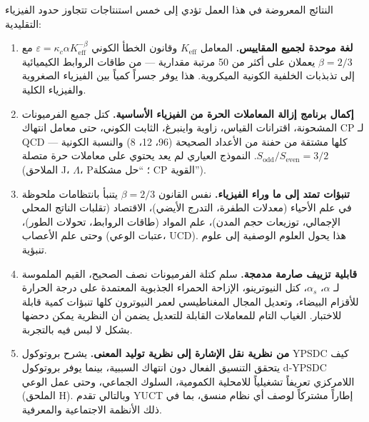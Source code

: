 \documentclass[11pt,a4paper]{article}
\begin{document}
	النتائج المعروضة في هذا العمل تؤدي إلى خمس استنتاجات تتجاوز حدود الفيزياء التقليدية:
	\begin{enumerate}
		\item \textbf{لغة موحدة لجميع المقاييس.} المعامل $K_{\mathrm{eff}}$ وقانون الخطأ الكوني $\varepsilon = \kappa_c \alpha K_{\mathrm{eff}}^{-\beta}$ مع $\beta = 2/3$ يعملان على أكثر من 50 مرتبة مقدارية — من طاقات الروابط الكيميائية إلى تذبذبات الخلفية الكونية الميكروية. هذا يوفر جسراً كمياً بين الفيزياء الصغروية والفيزياء الكلية.
		
		\item \textbf{إكمال برنامج إزالة المعاملات الحرة من الفيزياء الأساسية.} كتل جميع الفرميونات المشحونة، اقترانات القياس، زاوية واينبرغ، الثابت الكوني، حتى معامل انتهاك CP لـ QCD — كلها مشتقة من حفنة من الأعداد الصحيحة (96، 12، 8) والنسبة الكونية $S_{\mathrm{odd}}/S_{\mathrm{even}} = 3/2$. النموذج العياري لم يعد يحتوي على معاملات حرة متصلة (الملاحق J، $\Lambda$، P؛ ``حل مشكلة CP القوية'').
		
		\item \textbf{تنبؤات تمتد إلى ما وراء الفيزياء.} نفس القانون $\beta = 2/3$ يتنبأ بانتظامات ملحوظة في علم الأحياء (معدلات الطفرة، التدرج الأيضي)، الاقتصاد (تقلبات الناتج المحلي الإجمالي، توزيعات حجم المدن)، علم المواد (طاقات الروابط، تحولات الطور)، وحتى علم الأعصاب (عتبات الوعي، UCD). هذا يحول العلوم الوصفية إلى علوم تنبؤية.
		
		\item \textbf{قابلية تزييف صارمة مدمجة.} سلم كتلة الفرميونات نصف الصحيح، القيم الملموسة لـ $\alpha$، $\alpha_s$، كتل النيوترينو، الإزاحة الحمراء الجذبوية المعتمدة على درجة الحرارة للأقزام البيضاء، وتعديل المجال المغناطيسي لعمر النيوترون كلها تنبؤات كمية قابلة للاختبار. الغياب التام للمعاملات القابلة للتعديل يضمن أن النظرية يمكن دحضها بشكل لا لبس فيه بالتجربة.
		
		\item \textbf{من نظرية نقل الإشارة إلى نظرية توليد المعنى.} يشرح بروتوكول YPSDC كيف يتحقق التنسيق الفعال دون انتهاك السببية، بينما يوفر بروتوكول d‑YPSDC اللامركزي تعريفاً تشغيلياً للامحلية الكمومية، السلوك الجماعي، وحتى عمل الوعي (الملحق H). وبالتالي تقدم YUCT إطاراً مشتركاً لوصف أي نظام منسق، بما في ذلك الأنظمة الاجتماعية والمعرفية.
	\end{enumerate}
	
\end{document}
